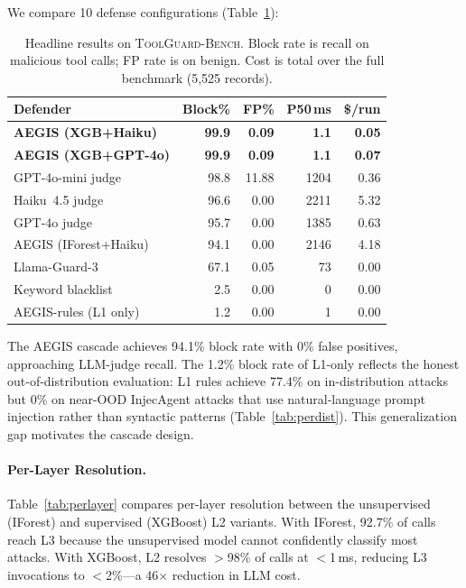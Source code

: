 \documentclass[sigconf,nonacm]{acmart}
\newcommand{\bench}{\textsc{ToolGuard-Bench}\xspace}
\begin{document}
We compare 10 defense configurations (Table~\ref{tab:overall}):

\begin{table}[t]
\centering\small
\caption{Headline results on \bench. Block rate is recall on malicious tool calls; FP rate is on benign. Cost is total over the full benchmark (5{,}525 records).}
\vspace{-0.1in}
\label{tab:overall}
\begin{tabular}{lrrrr}
\toprule
Defender & Block\% & FP\% & P50\,ms & \$/run \\
\midrule
\rowcolor{green!8}
\textbf{AEGIS (XGB+Haiku)} & \textbf{99.9} & \textbf{0.09} & \textbf{1.1} & \textbf{0.05} \\
\rowcolor{green!8}
\textbf{AEGIS (XGB+GPT-4o)} & \textbf{99.9} & \textbf{0.09} & \textbf{1.1} & \textbf{0.07} \\
GPT-4o-mini judge & 98.8 & 11.88 & 1204 & 0.36 \\
Haiku~4.5 judge & 96.6 & 0.00 & 2211 & 5.32 \\
GPT-4o judge & 95.7 & 0.00 & 1385 & 0.63 \\
AEGIS (IForest+Haiku) & 94.1 & 0.00 & 2146 & 4.18 \\
Llama-Guard-3 & 67.1 & 0.05 & 73 & 0.00 \\
Keyword blacklist & 2.5 & 0.00 & 0 & 0.00 \\
AEGIS-rules (L1 only) & 1.2 & 0.00 & 1 & 0.00 \\
\bottomrule
\end{tabular}
\vspace{-0.1in}
\end{table}

The AEGIS cascade achieves 94.1\% block rate with 0\% false positives, approaching LLM-judge recall. The 1.2\% block rate of L1-only reflects the honest out-of-distribution evaluation: L1 rules achieve 77.4\% on in-distribution attacks but 0\% on near-OOD InjecAgent attacks that use natural-language prompt injection rather than syntactic patterns (Table~\ref{tab:perdist}). This generalization gap motivates the cascade design.

\paragraph{Per-Layer Resolution.}
Table~\ref{tab:perlayer} compares per-layer resolution between the unsupervised (IForest) and supervised (XGBoost) L2 variants. With IForest, 92.7\% of calls reach L3 because the unsupervised model cannot confidently classify most attacks. With XGBoost, L2 resolves $>$98\% of calls at $<$1\,ms, reducing L3 invocations to $<$2\%---a 46$\times$ reduction in LLM cost.
\end{document}
